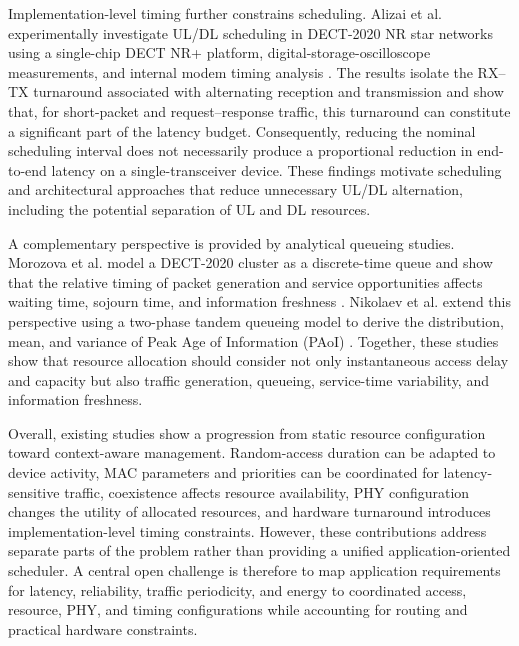 Implementation-level timing further constrains scheduling. Alizai et al.
experimentally investigate UL/DL scheduling in DECT-2020 NR star networks
using a single-chip DECT NR+ platform, digital-storage-oscilloscope
measurements, and internal modem timing analysis
\cite{alizaiMeasurementDrivenLatencyAnalysis2026}. The results isolate the
RX--TX turnaround associated with alternating reception and transmission and
show that, for short-packet and request--response traffic, this turnaround can
constitute a significant part of the latency budget. Consequently, reducing
the nominal scheduling interval does not necessarily produce a proportional
reduction in end-to-end latency on a single-transceiver device. These findings
motivate scheduling and architectural approaches that reduce unnecessary
UL/DL alternation, including the potential separation of UL and DL resources.

A complementary perspective is provided by analytical queueing studies.
Morozova et al. model a DECT-2020 cluster as a discrete-time queue and show
that the relative timing of packet generation and service opportunities
affects waiting time, sojourn time, and information freshness
\cite{morozovaComparisonTwoModels2026a}. Nikolaev et al. extend this
perspective using a two-phase tandem queueing model to derive the distribution,
mean, and variance of Peak Age of Information (PAoI)
\cite{nikolaevModelingDECT2020Tandem2026}. Together, these studies show that
resource allocation should consider not only instantaneous access delay and
capacity but also traffic generation, queueing, service-time variability, and
information freshness.

Overall, existing studies show a progression from static resource
configuration toward context-aware management. Random-access duration can be
adapted to device activity, MAC parameters and priorities can be coordinated
for latency-sensitive traffic, coexistence affects resource availability, PHY
configuration changes the utility of allocated resources, and hardware
turnaround introduces implementation-level timing constraints. However, these
contributions address separate parts of the problem rather than providing a
unified application-oriented scheduler. A central open challenge is therefore
to map application requirements for latency, reliability, traffic periodicity,
and energy to coordinated access, resource, PHY, and timing configurations
while accounting for routing and practical hardware constraints.


